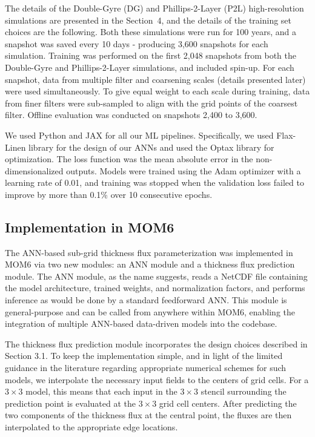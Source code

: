 \documentclass[draft]{agujournal2019}
\begin{document}
The details of the Double-Gyre (DG) and Phillips-2-Layer (P2L) high-resolution simulations are presented in the Section~4, and the details of the training set choices are the following. 
Both these simulations were run for 100 years, and a snapshot was saved every 10 days - producing 3,600 snapshots for each simulation.
Training was performed on the first 2,048 snapshots from both the Double-Gyre and Phillips-2-Layer simulations, and included spin-up. For each snapshot, data from multiple filter and coarsening scales (details presented later) were used simultaneously. 
To give equal weight to each scale during training, data from finer filters were sub-sampled to align with the grid points of the coarsest filter. 
Offline evaluation was conducted on snapshots 2,400 to 3,600. 

We used Python and JAX \cite{jax2018github} %
for all our ML pipelines. Specifically, we used Flax-Linen library \cite{flax2020github} %
for the design of our ANNs and used the Optax library \cite{deepmind2020jax} %
for optimization. The loss function was the mean absolute error in the non-dimensionalized outputs. Models were trained using the Adam optimizer with a learning rate of 0.01, and training was stopped when the validation loss failed to improve by more than 0.1\% over 10 consecutive epochs. 

\subsection{Implementation in MOM6}
The ANN-based sub-grid thickness flux parameterization was implemented in MOM6 via two new modules: an ANN module and a thickness flux prediction module. The ANN module, as the name suggests, reads a NetCDF file containing the model architecture, trained weights, and normalization factors, and performs inference as would be done by a standard feedforward ANN. This module is general-purpose and can be called from anywhere within MOM6, enabling the integration of multiple ANN-based data-driven models into the codebase.

The thickness flux prediction module incorporates the design choices described in Section 3.1. To keep the implementation simple, and in light of the limited guidance in the literature regarding appropriate numerical schemes for such models, we interpolate the necessary input fields to the centers of grid cells. For a $3\times3$ model, this means that each input in the $3\times3$ stencil surrounding the prediction point is evaluated at the $3\times3$ grid cell centers. After predicting the two components of the thickness flux at the central point, the fluxes are then interpolated to the appropriate edge locations.
\end{document}
